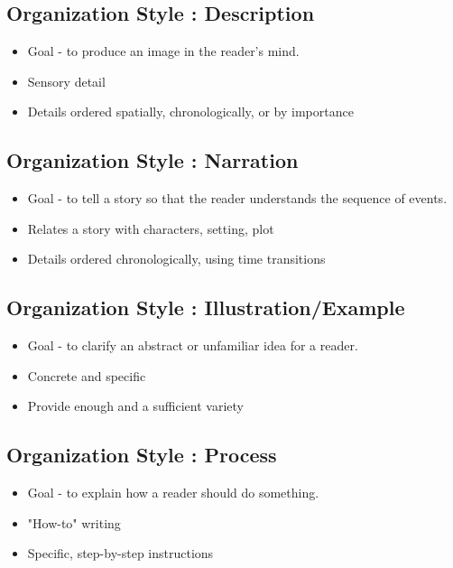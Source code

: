\documentclass[12pt]{article}
\begin{document}
    \subsection{Organization Style : Description}
    \begin{itemize}
        \item Goal - to produce an image in the reader's mind.
        \item Sensory detail
	\item Details ordered spatially, chronologically, or by importance
    \end{itemize}

    \subsection{Organization Style : Narration}
    \begin{itemize}
        \item Goal - to tell a story so that the reader understands the sequence of events.
        \item Relates a story with characters, setting, plot
	\item Details ordered chronologically, using time transitions
    \end{itemize}
	
    \subsection{Organization Style : Illustration/Example}
    \begin{itemize}
        \item Goal - to clarify an abstract or unfamiliar idea for a reader.
        \item Concrete and specific
	\item Provide enough and a sufficient variety
    \end{itemize}
	
    \subsection{Organization Style : Process}
    \begin{itemize}
        \item Goal - to explain how a reader should do something.
	\item "How-to" writing
	\item Specific, step-by-step instructions
    \end{itemize}
\end{document}
